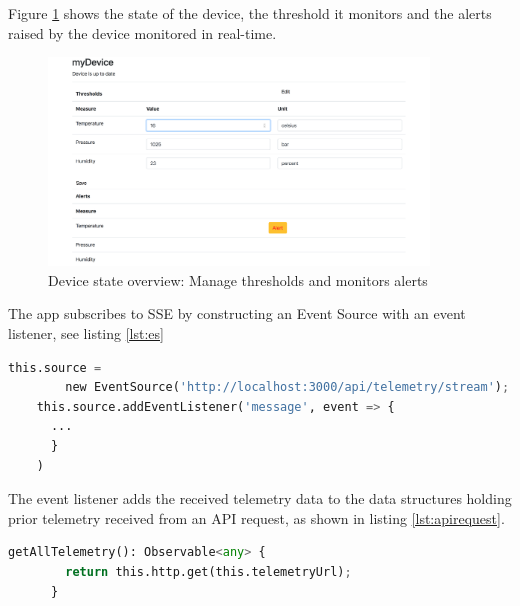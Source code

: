 Figure \ref{fig:deviceoverview} shows the state of the device, the threshold it monitors and the alerts raised by the device monitored in real-time.

\begin{figure}[H]
    \centering
    \includegraphics[width=0.9\textwidth]{figures/App/app_device_settings}
    \caption{Device state overview: Manage thresholds and monitors alerts}
    \label{fig:deviceoverview}
\end{figure}

The app subscribes to SSE by constructing an Event Source with an event listener, see listing \ref{lst:es}

\begin{lstlisting}[language=Python, caption=Event Source, label={lst:es}, basicstyle=\scriptsize]
    this.source = 
        new EventSource('http://localhost:3000/api/telemetry/stream');
    this.source.addEventListener('message', event => {
      ...
      }
    )
\end{lstlisting}

The event listener adds the received telemetry data to the data structures holding prior telemetry received from an API request, as shown in listing \ref{lst:apirequest}. 


\begin{lstlisting}[language=Python, caption=API Request, label={lst:apirequest}, basicstyle=\scriptsize]
    getAllTelemetry(): Observable<any> {
        return this.http.get(this.telemetryUrl);
      }
\end{lstlisting}